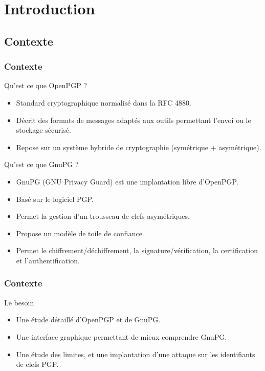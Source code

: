 \section{Introduction}
\subsection{Contexte}
\begin{frame}
    \frametitle{\color{white}Contexte}
    \begin{block}{Qu'est ce que OpenPGP ?}
    	\begin{itemize}
         \item Standard cryptographique normalisé dans la RFC 4880.
         \item Décrit des formats de messages adaptés aux outils permettant l’envoi ou le stockage sécurisé.
         \item Repose sur un système hybride de cryptographie (symétrique + asymétrique).
       \end{itemize} 
    \end{block}
    \begin{block}{Qu'est ce que GnuPG ?}
      \begin{itemize}
        \item GnuPG (GNU Privacy Guard) est une implantation libre d'OpenPGP.
        \item Basé sur le logiciel PGP.
        \item Permet la gestion d'un trousseau de clefs asymétriques.
        \item Propose un modèle de toile de confiance.
        \item Permet le chiffrement/déchiffrement, la signature/vérification, la certification et l'authentification.
      \end{itemize}
    \end{block}
\end{frame}

\begin{frame}
    \frametitle{\color{white}Contexte}
    \begin{block}{Le besoin}
    	\begin{itemize}
         \item Une étude détaillé d'OpenPGP et de GnuPG.
         \item Une interface graphique permettant de mieux comprendre GnuPG.
         \item Une étude des limites, et une implantation d'une attaque sur les identifiants de clefs PGP.
       \end{itemize} 
    \end{block}
\end{frame}

